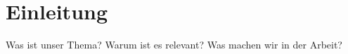 \onehalfspacing
\chapter{Einleitung}
Was ist unser Thema?
Warum ist es relevant?
Was machen wir in der Arbeit?